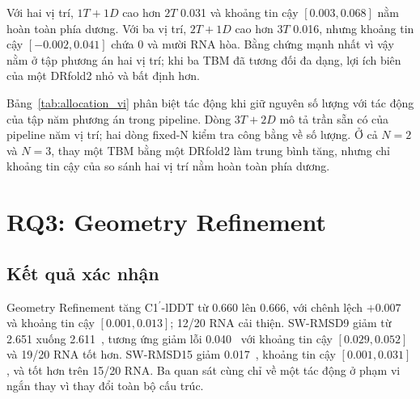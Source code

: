 \documentclass[12pt,a4paper,oneside]{report}
\newcommand{\cprime}{C1$^{\prime}$}
\newcommand{\angstrom}{\text{\AA}}
\begin{document}
Với hai vị trí, $1T+1D$ cao hơn $2T$ 0.031 và khoảng tin cậy $[0.003,0.068]$ nằm hoàn
toàn phía dương. Với ba vị trí, $2T+1D$ cao hơn $3T$ 0.016, nhưng khoảng tin cậy
$[-0.002,0.041]$ chứa 0 và mười RNA hòa. Bằng chứng mạnh nhất vì vậy nằm ở tập phương án hai vị
trí; khi ba TBM đã tương đối đa dạng, lợi ích biên của một DRfold2 nhỏ và bất định hơn.

\begin{table}[H]
\centering
\caption{Phân bổ phương án khi tắt Geometry Refinement.}
\label{tab:allocation_vi}
\end{table}

Bảng~\ref{tab:allocation_vi} phân biệt tác động khi giữ nguyên số lượng với tác động của
tập năm phương án trong pipeline. Dòng $3T+2D$ mô tả trần sẵn có của pipeline năm vị trí;
hai dòng fixed-N kiểm tra công bằng về số lượng. Ở cả $N=2$ và $N=3$, thay một TBM bằng
một DRfold2 làm trung bình tăng, nhưng chỉ khoảng tin
cậy của so sánh hai vị trí nằm hoàn toàn phía dương.

\section{RQ3: Geometry Refinement}

\subsection{Kết quả xác nhận}

Geometry Refinement tăng \cprime{}-lDDT từ 0.660 lên 0.666, với chênh lệch $+0.007$ và
khoảng tin cậy $[0.001,0.013]$; 12/20 RNA cải thiện. SW-RMSD9 giảm từ 2.651 xuống
2.611~\angstrom{}, tương ứng giảm lỗi 0.040~\angstrom{} với khoảng tin cậy
$[0.029,0.052]$ và 19/20 RNA tốt hơn. SW-RMSD15 giảm 0.017~\angstrom{}, khoảng tin cậy
$[0.001,0.031]$, và tốt hơn trên 15/20 RNA. Ba quan sát cùng chỉ về một tác động ở phạm
vi ngắn thay vì thay đổi toàn bộ cấu trúc.
\end{document}
